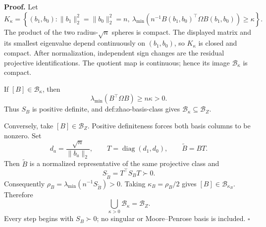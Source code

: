 \textbf{Proof.}
Let
\[
 K_\kappa=\left\{(b_1,b_0):\lVert b_1\rVert_2^2=\lVert b_0\rVert_2^2=n,
 \ \lambda_{\min}\!\left(n^{-1}B(b_1,b_0)^{\top}\Omega B(b_1,b_0)\right)\ge\kappa\right\}.
\]
The product of the two radius-\(\sqrt n\) spheres is compact.  The displayed matrix and its smallest eigenvalue depend continuously on \((b_1,b_0)\), so \(K_\kappa\) is closed and compact.  After normalization, independent sign changes are the residual projective identifications.  The quotient map is continuous; hence its image \(\mathcal B_\kappa\) is compact.

If \([B]\in\mathcal B_\kappa\), then
\[
 \lambda_{\min}(B^{\top}\Omega B)\ge n\kappa>0.
\]
Thus \(S_B\) is positive definite, and def:zhao-basis-class gives \(\mathcal B_\kappa\subseteq\mathcal B_Z\).

Conversely, take \([B]\in\mathcal B_Z\).  Positive definiteness forces both basis columns to be nonzero.  Set
\[
 d_a=\frac{\sqrt n}{\lVert b_a\rVert_2},\qquad
 T=\operatorname{diag}(d_1,d_0),\qquad
 \widetilde B=BT.
\]
Then \(\widetilde B\) is a normalized representative of the same projective class and
\[
 S_{\widetilde B}=T^{\top}S_BT\succ0.
\]
Consequently \(\rho_B=\lambda_{\min}(n^{-1}S_{\widetilde B})>0\).  Taking \(\kappa_B=\rho_B/2\) gives \([B]\in\mathcal B_{\kappa_B}\).  Therefore
\[
 \bigcup_{\kappa>0}\mathcal B_\kappa=\mathcal B_Z.
\]
Every step begins with \(S_B\succ0\); no singular or Moore--Penrose basis is included. \(\square\)